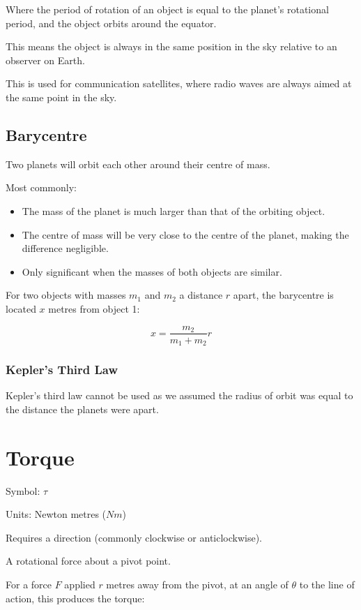 \documentclass[a4paper,11pt]{report}
\begin{document}
Where the period of rotation of an object is equal to the planet's rotational
period, and the object orbits around the equator.

This means the object is always in the same position in the sky relative to an
observer on Earth.

This is used for communication satellites, where radio waves are always aimed
at the same point in the sky.

\subsection{Barycentre}

Two planets will orbit each other around their centre of mass.

Most commonly:

\begin{itemize}
\item The mass of the planet is much larger than that of the orbiting object.
\item The centre of mass will be very close to the centre of the planet, making
	the difference negligible.
\item Only significant when the masses of both objects are similar.
\end{itemize}

For two objects with masses $m_1$ and $m_2$ a distance $r$ apart, the barycentre
is located $x$ metres from object 1:

$$
x = \frac{m_2}{m_1 + m_2} r
$$

\subsubsection{Kepler's Third Law}

Kepler's third law cannot be used as we assumed the radius of orbit was equal
to the distance the planets were apart.


\section{Torque}

Symbol: $\tau$

Units: Newton metres ($N m$)

Requires a direction (commonly clockwise or anticlockwise).

A rotational force about a pivot point.

For a force $F$ applied $r$ metres away from the pivot, at an angle of $\theta$
to the line of action, this produces the torque:
\end{document}
